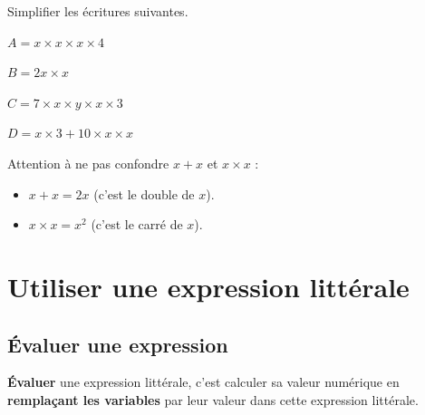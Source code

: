 \documentclass[a4paper]{book}
\begin{document}
    
    \begin{exemple}
        Simplifier les écritures suivantes.

        \medskip

        \begin{minipage}{0.24\linewidth}
            $A=x\times x\times x \times 4$

            \vspace{1cm}
        \end{minipage}
        \hfill\vline\hfill
        \begin{minipage}{0.24\linewidth}
            $B=2x\times x$

            \vspace{1cm}
        \end{minipage}
        \hfill\vline\hfill
        \begin{minipage}{0.24\linewidth}
            $C=7\times x\times y \times x \times 3$

            \vspace{1cm}
        \end{minipage}
        \hfill\vline\hfill
        \begin{minipage}{0.24\linewidth}
            $D=x\times3+10\times x\times x$

            \vspace{1cm}
        \end{minipage}
    \end{exemple}
    
    
    \begin{remarque}
        Attention à ne pas confondre $x + x$ et $x \times x$ :
        \begin{itemize}
            \item $x + x = 2x$ (c'est le double de $x$).
            \item $x \times x = x^2$ (c'est le carré de $x$).
        \end{itemize}
    \end{remarque}
    
    
\section{Utiliser une expression littérale}  
\subsection{Évaluer une expression}
    
    \begin{definition}[Évaluer]
        \textbf{Évaluer} une expression littérale, c'est calculer sa valeur numérique en \textbf{remplaçant les variables} par leur valeur dans cette expression littérale.
    \end{definition}
\end{document}
